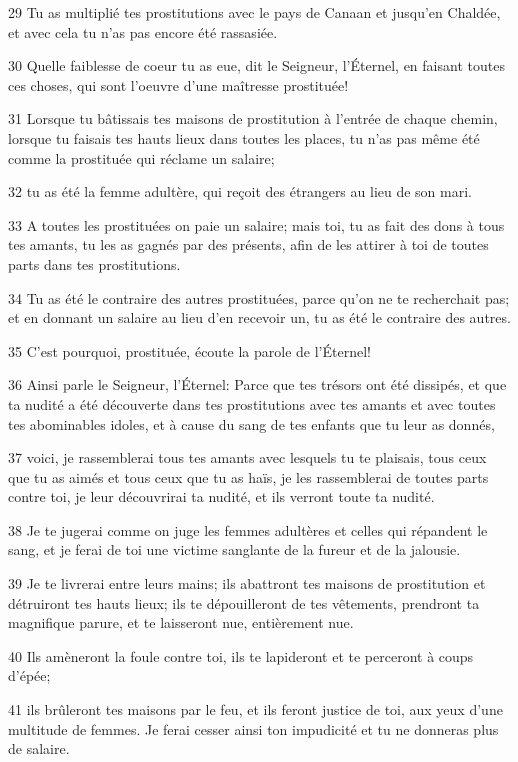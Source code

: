 \par 29 Tu as multiplié tes prostitutions avec le pays de Canaan et jusqu'en Chaldée, et avec cela tu n'as pas encore été rassasiée.
\par 30 Quelle faiblesse de coeur tu as eue, dit le Seigneur, l'Éternel, en faisant toutes ces choses, qui sont l'oeuvre d'une maîtresse prostituée!
\par 31 Lorsque tu bâtissais tes maisons de prostitution à l'entrée de chaque chemin, lorsque tu faisais tes hauts lieux dans toutes les places, tu n'as pas même été comme la prostituée qui réclame un salaire;
\par 32 tu as été la femme adultère, qui reçoit des étrangers au lieu de son mari.
\par 33 A toutes les prostituées on paie un salaire; mais toi, tu as fait des dons à tous tes amants, tu les as gagnés par des présents, afin de les attirer à toi de toutes parts dans tes prostitutions.
\par 34 Tu as été le contraire des autres prostituées, parce qu'on ne te recherchait pas; et en donnant un salaire au lieu d'en recevoir un, tu as été le contraire des autres.
\par 35 C'est pourquoi, prostituée, écoute la parole de l'Éternel!
\par 36 Ainsi parle le Seigneur, l'Éternel: Parce que tes trésors ont été dissipés, et que ta nudité a été découverte dans tes prostitutions avec tes amants et avec toutes tes abominables idoles, et à cause du sang de tes enfants que tu leur as donnés,
\par 37 voici, je rassemblerai tous tes amants avec lesquels tu te plaisais, tous ceux que tu as aimés et tous ceux que tu as haïs, je les rassemblerai de toutes parts contre toi, je leur découvrirai ta nudité, et ils verront toute ta nudité.
\par 38 Je te jugerai comme on juge les femmes adultères et celles qui répandent le sang, et je ferai de toi une victime sanglante de la fureur et de la jalousie.
\par 39 Je te livrerai entre leurs mains; ils abattront tes maisons de prostitution et détruiront tes hauts lieux; ils te dépouilleront de tes vêtements, prendront ta magnifique parure, et te laisseront nue, entièrement nue.
\par 40 Ils amèneront la foule contre toi, ils te lapideront et te perceront à coups d'épée;
\par 41 ils brûleront tes maisons par le feu, et ils feront justice de toi, aux yeux d'une multitude de femmes. Je ferai cesser ainsi ton impudicité et tu ne donneras plus de salaire.
